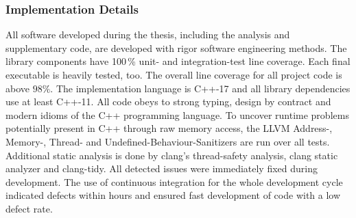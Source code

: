 \subsubsection{Implementation Details}

All software developed during the thesis, including the analysis and supplementary code, are developed with rigor software engineering methods.
The library components have 100\,\% unit- and integration-test line coverage.
Each final executable is heavily tested, too.
The overall line coverage for all project code is above $98\%$.
The implementation language is C++-17\cite{c++17} and all library dependencies use at least C++-11\cite{c++11}.
All code obeys to strong typing, design by contract\cite{meyer_ieee1992} and modern idioms of the C++ programming language\cite{stroustrup_cpppl2013}.
To uncover runtime problems potentially present in C++ through raw memory access, the LLVM Address-, Memory-, Thread- and Undefined-Behaviour-Sanitizers\cite{google_sanitizers} are run over all tests.
Additional static analysis is done by clang's thread-safety analysis\cite{clang_thread_safety}, clang static analyzer\cite{clang_static_analyzer} and clang-tidy\cite{babati2017static}.
All detected issues were immediately fixed during development.
The use of continuous integration\cite{fowler_ci2000} for the whole development cycle indicated defects within hours and ensured fast development of code with a low defect rate.

